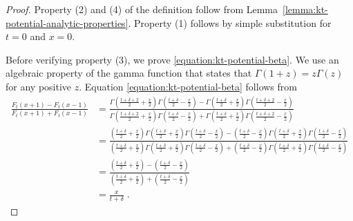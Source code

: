 \begin{proof}
Property (2) and (4) of the definition follow from
Lemma~\ref{lemma:kt-potential-analytic-properties}.
Property (1) follows by simple substitution for $t=0$ and $x=0$.

Before verifying property (3), we prove \eqref{equation:kt-potential-beta}. We
use an algebraic property of the gamma function that states that $\Gamma(1+z) =
z \Gamma(z)$ for any positive $z$. Equation \eqref{equation:kt-potential-beta}
follows from
\begin{align*}
\frac{F_t(x + 1) - F_t(x - 1)}{F_t(x + 1) + F_t(x - 1)}
& = \frac{\Gamma(\frac{t+\delta+2}{2} + \frac{x}{2}) \Gamma(\frac{t+\delta}{2} - \frac{x}{2}) - \Gamma(\frac{t+\delta}{2} + \frac{x}{2}) \Gamma(\frac{t+\delta+2}{2} - \frac{x}{2})}{\Gamma(\frac{t+\delta+2}{2} + \frac{x}{2}) \Gamma(\frac{t + \delta}{2} - \frac{x}{2}) + \Gamma(\frac{t + \delta}{2} + \frac{x}{2}) \Gamma(\frac{t+\delta+2}{2} - \frac{x}{2})} \\
& = \frac{(\frac{t+\delta}{2} + \frac{x}{2})\Gamma(\frac{t+\delta}{2} + \frac{x}{2}) \Gamma(\frac{t+\delta}{2} - \frac{x}{2}) - (\frac{t+\delta}{2} - \frac{x}{2})\Gamma(\frac{t+\delta}{2} + \frac{x}{2}) \Gamma(\frac{t+\delta}{2} - \frac{x}{2})}{(\frac{t+\delta}{2} + \frac{x}{2})\Gamma(\frac{t+\delta}{2} + \frac{x}{2}) \Gamma(\frac{t+\delta}{2} - \frac{x}{2}) + (\frac{t+\delta}{2} - \frac{x}{2})\Gamma(\frac{t+\delta}{2} + \frac{x}{2}) \Gamma(\frac{t+\delta}{2} - \frac{x}{2})} \\
& = \frac{(\frac{t+\delta}{2} + \frac{x}{2}) - (\frac{t+\delta}{2} - \frac{x}{2})}{(\frac{t+\delta}{2} + \frac{x}{2}) + (\frac{t+\delta}{2} - \frac{x}{2})} \\
& = \frac{x}{t+\delta} \; .
\end{align*}


\end{proof}
